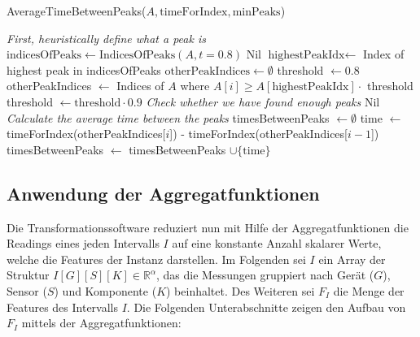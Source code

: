 \begin{algorithm}
    \caption{AverageTimeBetweenPeaks($A, \text{timeForIndex}, \text{minPeaks}$)}
    \label{algo:avgTimeBetweenPeaks}
    \begin{algorithmic}
        \State \LeftComment \textit{First, heuristically define what a peak is}
        \State $\text{indicesOfPeaks} \gets \text{IndicesOfPeaks}(A, t = 0.8)$
            \State \Return Nil
        \EndIf
        \State $\text{highestPeakIdx} \gets$ Index of highest peak in indicesOfPeaks
        \State {}
        \State $\text{otherPeakIndices} \gets \emptyset$
        \State threshold $\gets 0.8$
        \Repeat
            \State otherPeakIndices $\gets$ Indices of $A$ where $A[i] \geq A[\text{highestPeakIdx}] \cdot $ threshold
            \State threshold $\gets \text{threshold} \cdot 0.9$
        \State \LeftComment \textit{Check whether we have found enough peaks}
            \State \Return Nil
        \EndIf
        \State \LeftComment \textit{Calculate the average time between the peaks}
        \State timesBetweenPeaks $\gets \emptyset$
            \State time $\gets$ timeForIndex(otherPeakIndices[$i$]) - timeForIndex(otherPeakIndices[$i - 1$])
            \State timesBetweenPeaks $\gets$ timesBetweenPeaks $\cup \{\text{time}\}$
        \EndFor
        \State \Return {}
    \end{algorithmic}
\end{algorithm}

\subsection{Anwendung der Aggregatfunktionen}
Die Transformationssoftware reduziert nun mit Hilfe der Aggregatfunktionen die Readings eines jeden Intervalls $I$ auf eine konstante Anzahl skalarer Werte, welche die Features der Instanz darstellen. Im Folgenden sei $I$ ein Array der Struktur $I[G][S][K] \in \mathbb{R}^\alpha$, das die Messungen gruppiert nach Gerät ($G$), Sensor ($S$) und Komponente ($K$) beinhaltet. Des Weiteren sei $F_I$ die Menge der Features des Intervalls $I$. Die Folgenden Unterabschnitte zeigen den Aufbau von $F_I$ mittels der Aggregatfunktionen:

